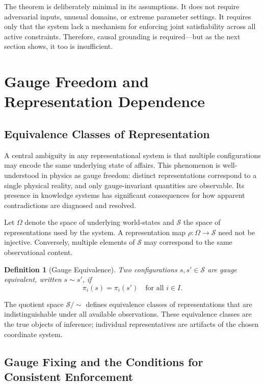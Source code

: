 \documentclass[12pt, oneside]{article}
\newtheorem{definition}{Definition}
\begin{document}
The theorem is deliberately minimal in its assumptions. It does not require adversarial inputs, unusual domains, or extreme parameter settings. It requires only that the system lack a mechanism for enforcing joint satisfiability across all active constraints. Therefore, causal grounding is required---but as the next section shows, it too is insufficient.

\section{Gauge Freedom and Representation Dependence}

\subsection{Equivalence Classes of Representation}

A central ambiguity in any representational system is that multiple configurations may encode the same underlying state of affairs. This phenomenon is well-understood in physics as gauge freedom: distinct representations correspond to a single physical reality, and only gauge-invariant quantities are observable. Its presence in knowledge systems has significant consequences for how apparent contradictions are diagnosed and resolved.

Let $\Omega$ denote the space of underlying world-states and $\mathcal{S}$ the space of representations used by the system. A representation map $\rho : \Omega \to \mathcal{S}$ need not be injective. Conversely, multiple elements of $\mathcal{S}$ may correspond to the same observational content.

\begin{definition}[Gauge Equivalence]
Two configurations $s, s' \in \mathcal{S}$ are gauge equivalent, written $s \sim s'$, if
\begin{equation}
  \pi_i(s) = \pi_i(s') \quad \text{for all } i \in I.
\end{equation}
\end{definition}

The quotient space $\mathcal{S}/{\sim}$ defines equivalence classes of representations that are indistinguishable under all available observations. These equivalence classes are the true objects of inference; individual representatives are artifacts of the chosen coordinate system.

\subsection{Gauge Fixing and the Conditions for Consistent Enforcement}
\end{document}
